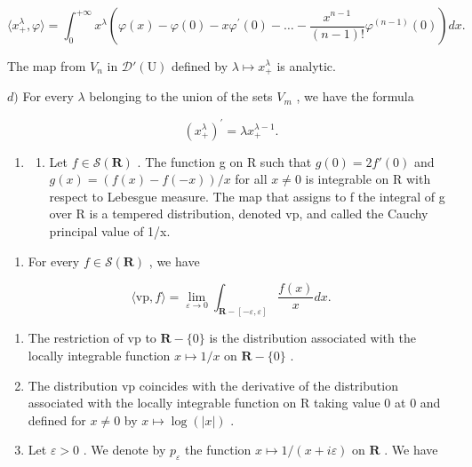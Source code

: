 \[
\langle x _ {+} ^ {\lambda}, \varphi \rangle = \int_ {0} ^ {+ \infty} x ^ {\lambda} \left(\varphi (x) - \varphi (0) - x \varphi^ {\prime} (0) - \dots - \frac {x ^ {n - 1}}{(n - 1) !} \varphi^ {(n - 1)} (0)\right) d x.
\]

The map from \(V_{n}\) in \(\mathcal{D}'(\mathrm{U})\) defined by \(\lambda\mapsto x_{+}^{\lambda}\) is analytic.

\(d)\) For every \(\lambda\) belonging to the union of the sets \(V_{m}\) , we have the formula

\[
(x _ {+} ^ {\lambda}) ^ {\prime} = \lambda x _ {+} ^ {\lambda - 1}.
\]

\begin{enumerate}
\def\labelenumi{\arabic{enumi})}
\setcounter{enumi}{20}
\tightlist
\item
  \begin{enumerate}
  \def\labelenumii{\alph{enumii})}
  \tightlist
  \item
    Let \(f \in \mathcal{S}(\mathbf{R})\) . The function g on R such that \(g(0) = 2f'(0)\) and \(g(x) = (f(x) - f(-x))/x\) for all \(x \neq 0\) is integrable on R with respect to Lebesgue measure. The map that assigns to f the integral of g over R is a tempered distribution, denoted vp, and called the Cauchy principal value of 1/x.
  \end{enumerate}
\end{enumerate}

\begin{enumerate}
\def\labelenumi{\alph{enumi})}
\setcounter{enumi}{1}
\tightlist
\item
  For every \(f \in \mathcal{S}(\mathbf{R})\) , we have
\end{enumerate}

\[
\langle \mathrm{vp}, f \rangle = \lim _ {\varepsilon \rightarrow 0} \int_ {\mathbf {R} - [ - \varepsilon , \varepsilon ]} \frac {f (x)}{x} d x.
\]

\begin{enumerate}
\def\labelenumi{\alph{enumi})}
\setcounter{enumi}{2}
\item
  The restriction of vp to \(\mathbf{R} - \{0\}\) is the distribution associated with the locally integrable function \(x \mapsto 1/x\) on \(\mathbf{R} - \{0\}\) .
\item
  The distribution vp coincides with the derivative of the distribution associated with the locally integrable function on R taking value 0 at 0 and defined for \(x \neq 0\) by \(x \mapsto \log(|x|)\) .
\item
  Let \(\varepsilon > 0\) . We denote by \(p_{\varepsilon}\) the function \(x \mapsto 1 / (x + i\varepsilon)\) on \(\mathbf{R}\) . We have
\end{enumerate}

